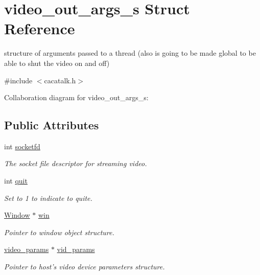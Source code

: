 \hypertarget{structvideo__out__args__s}{\section{video\-\_\-out\-\_\-args\-\_\-s \-Struct \-Reference}
\label{structvideo__out__args__s}
}


structure of arguments passed to a thread (also is going to be made global to be able to shut the video on and off)  




{\ttfamily \#include $<$cacatalk.\-h$>$}



\-Collaboration diagram for video\-\_\-out\-\_\-args\-\_\-s\-:
\subsection*{\-Public \-Attributes}
\begin{DoxyCompactItemize}
\item 
int \hyperlink{structvideo__out__args__s_aaf0a67c5a877ce3505ad692e62f40b27}{socketfd}
\begin{DoxyCompactList}\small\item\em \-The socket file descriptor for streaming video. \end{DoxyCompactList}\item 
int \hyperlink{structvideo__out__args__s_a3ccef1d0e1be0c01d38e75a4303fc46d}{quit}
\begin{DoxyCompactList}\small\item\em \-Set to 1 to indicate to quite. \end{DoxyCompactList}\item 
\hyperlink{cacatalk_8h_abe08d2c8dcdb909042427bfe5d771110}{\-Window} $\ast$ \hyperlink{structvideo__out__args__s_a4c05a7d1e0e170c01b122e3419434b7c}{win}
\begin{DoxyCompactList}\small\item\em \-Pointer to window object structure. \end{DoxyCompactList}\item 
\hyperlink{cacatalk_8h_ae3d11b6af4cc159b10400210dcefa284}{video\-\_\-params} $\ast$ \hyperlink{structvideo__out__args__s_a14fbf8a3ffd4d9534c61bff3fd6c6004}{vid\-\_\-params}
\begin{DoxyCompactList}\small\item\em \-Pointer to host's video device parameters structure. \end{DoxyCompactList}\end{DoxyCompactItemize}


